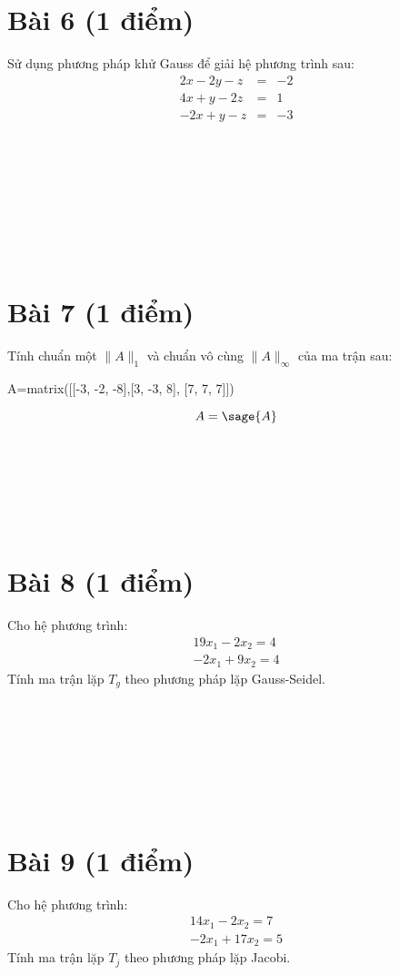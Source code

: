 \documentclass[12pt]{article}
\begin{document}
\section{Bài 6 (1 điểm)}
Sử dụng phương pháp khử Gauss để giải hệ phương trình sau:
\begin{eqnarray*}
    2x -2y -z &=& -2\\
    4x + y -2z &=& 1\\
    -2x + y -z &=& -3
  \end{eqnarray*}

\begin{verbatim}









\end{verbatim}

\section{Bài 7 (1 điểm)}
Tính chuẩn một $\|A\|_1$ và chuẩn vô cùng $\|A\|_{\infty}$ của ma trận sau:
\begin{sagesilent}
 A=matrix([[-3, -2, -8],[3, -3, 8], [7, 7, 7]])
\end{sagesilent}
\begin{equation*}
 A=\sage{A}
\end{equation*}
\begin{verbatim}







\end{verbatim}

\section{Bài 8 (1 điểm)}
Cho hệ phương trình:
\begin{eqnarray*}
19x_1-2x_2=4\\
-2x_1+9x_2=4
\end{eqnarray*}
Tính ma trận lặp $T_g$ theo phương pháp lặp Gauss-Seidel.
\begin{verbatim}








\end{verbatim}

\section{Bài 9 (1 điểm)}
Cho hệ phương trình:
\begin{eqnarray*}
14x_1-2x_2=7\\
-2x_1+17x_2=5
\end{eqnarray*}
Tính ma trận lặp $T_j$ theo phương pháp lặp Jacobi.
\end{document}
